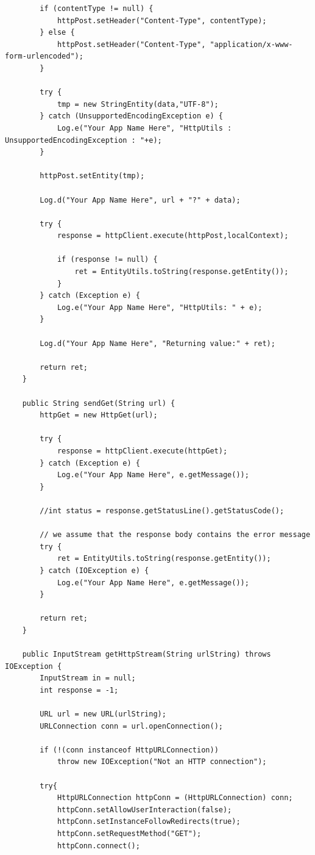\documentclass[12pt, %
openright, 
oneside, %
a4paper,    %
brazil]{facom-ufu-abntex2}
\begin{document}
\begin{anexosenv}
\begin{lstlisting}
        if (contentType != null) {
            httpPost.setHeader("Content-Type", contentType);
        } else {
            httpPost.setHeader("Content-Type", "application/x-www-form-urlencoded");
        }

        try {
            tmp = new StringEntity(data,"UTF-8");
        } catch (UnsupportedEncodingException e) {
            Log.e("Your App Name Here", "HttpUtils : UnsupportedEncodingException : "+e);
        }

        httpPost.setEntity(tmp);

        Log.d("Your App Name Here", url + "?" + data);

        try {
            response = httpClient.execute(httpPost,localContext);

            if (response != null) {
                ret = EntityUtils.toString(response.getEntity());
            }
        } catch (Exception e) {
            Log.e("Your App Name Here", "HttpUtils: " + e);
        }

        Log.d("Your App Name Here", "Returning value:" + ret);

        return ret;
    }

    public String sendGet(String url) {
        httpGet = new HttpGet(url);  

        try {
            response = httpClient.execute(httpGet);  
        } catch (Exception e) {
            Log.e("Your App Name Here", e.getMessage());
        }

        //int status = response.getStatusLine().getStatusCode();  

        // we assume that the response body contains the error message  
        try {
            ret = EntityUtils.toString(response.getEntity());  
        } catch (IOException e) {
            Log.e("Your App Name Here", e.getMessage());
        }

        return ret;
    }

    public InputStream getHttpStream(String urlString) throws IOException {
        InputStream in = null;
        int response = -1;

        URL url = new URL(urlString); 
        URLConnection conn = url.openConnection();

        if (!(conn instanceof HttpURLConnection))                     
            throw new IOException("Not an HTTP connection");

        try{
            HttpURLConnection httpConn = (HttpURLConnection) conn;
            httpConn.setAllowUserInteraction(false);
            httpConn.setInstanceFollowRedirects(true);
            httpConn.setRequestMethod("GET");
            httpConn.connect(); 


\end{lstlisting}
\end{anexosenv}
\end{document}
